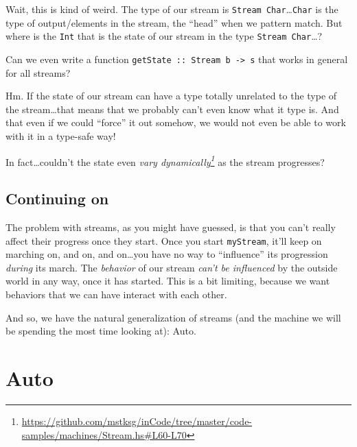 \documentclass[]{article}
\newenvironment{Shaded}{}{}
\newcommand{\DecValTok}[1]{\textcolor[rgb]{0.25,0.63,0.44}{#1}}
\newcommand{\FunctionTok}[1]{\textcolor[rgb]{0.02,0.16,0.49}{#1}}
\newcommand{\NormalTok}[1]{#1}
\newcommand{\StringTok}[1]{\textcolor[rgb]{0.25,0.44,0.63}{#1}}
\renewcommand{\href}[2]{#2\footnote{\url{#1}}}
\begin{document}
\begin{Shaded}
\end{Shaded}

Wait, this is kind of weird. The type of our stream is
\texttt{Stream\ Char}\ldots{}\texttt{Char} is the type of output/elements in the
stream, the ``head'' when we pattern match. But where is the \texttt{Int} that
is the state of our stream in the type \texttt{Stream\ Char}\ldots{}?

Can we even write a function
\texttt{getState\ ::\ Stream\ b\ -\textgreater{}\ s} that works in general for
all streams?

Hm. If the state of our stream can have a type totally unrelated to the type of
the stream\ldots{}that means that we probably can't even know what it type is.
And that even if we could ``force'' it out somehow, we would not even be able to
work with it in a type-safe way!

In fact\ldots{}couldn't the state even
\emph{\href{https://github.com/mstksg/inCode/tree/master/code-samples/machines/Stream.hs\#L60-L70}{vary
dynamically}} as the stream progresses?

\hypertarget{continuing-on}{%
\subsection{Continuing on}\label{continuing-on}}

The problem with streams, as you might have guessed, is that you can't really
affect their progress once they start. Once you start \texttt{myStream}, it'll
keep on marching on, and on, and on\ldots{}you have no way to ``influence'' its
progression \emph{during} its march. The \emph{behavior} of our stream
\emph{can't be influenced} by the outside world in any way, once it has started.
This is a bit limiting, because we want behaviors that we can have interact with
each other.

And so, we have the natural generalization of streams (and the machine we will
be spending the most time looking at): Auto.

\hypertarget{auto}{%
\section{Auto}\label{auto}}
\end{document}
